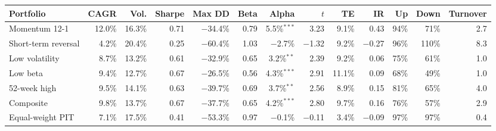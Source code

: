 \begin{tabular}{lrrrrrrrrrrrr}
\toprule
Portfolio & CAGR & Vol. & Sharpe & Max DD & Beta & Alpha & $t$ & TE & IR & Up & Down & Turnover \\
\midrule
Momentum 12-1 & 12.0\% & 16.3\% & 0.71 & $-$34.4\% & 0.79 & 5.5\%$^{***}$ & 3.23 & 9.1\% & 0.43 & 94\% & 71\% & 2.7 \\
Short-term reversal & 4.2\% & 20.4\% & 0.25 & $-$60.4\% & 1.03 & $-$2.7\% & $-$1.32 & 9.2\% & $-$0.27 & 96\% & 110\% & 8.3 \\
Low volatility & 8.7\% & 13.2\% & 0.61 & $-$32.9\% & 0.65 & 3.2\%$^{**}$ & 2.39 & 9.2\% & 0.06 & 75\% & 61\% & 1.0 \\
Low beta & 9.4\% & 12.7\% & 0.67 & $-$26.5\% & 0.56 & 4.3\%$^{***}$ & 2.91 & 11.1\% & 0.09 & 68\% & 49\% & 1.0 \\
52-week high & 9.5\% & 14.1\% & 0.63 & $-$39.7\% & 0.69 & 3.7\%$^{**}$ & 2.56 & 8.9\% & 0.15 & 81\% & 65\% & 4.0 \\
\midrule
Composite & 9.8\% & 13.7\% & 0.67 & $-$37.7\% & 0.65 & 4.2\%$^{***}$ & 2.80 & 9.7\% & 0.16 & 76\% & 57\% & 2.9 \\
\midrule
Equal-weight PIT & 7.1\% & 17.5\% & 0.41 & $-$53.3\% & 0.97 & $-$0.1\% & $-$0.11 & 3.4\% & $-$0.09 & 97\% & 97\% & 0.4 \\
\bottomrule
\end{tabular}
